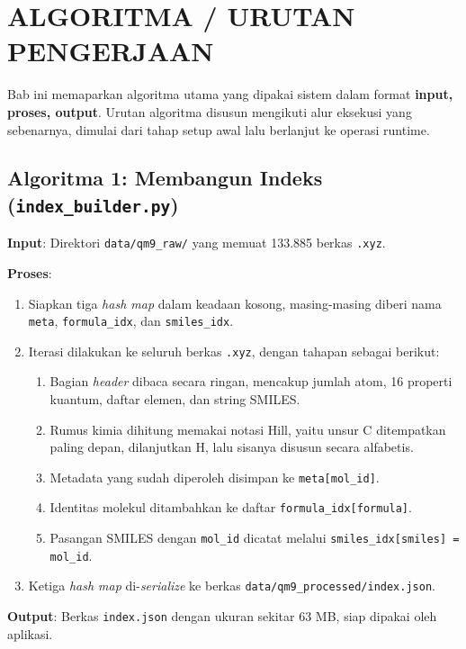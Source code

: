 \documentclass[a4paper,12pt]{report}
\begin{document}
\chapter{ALGORITMA / URUTAN PENGERJAAN}

Bab ini memaparkan algoritma utama yang dipakai sistem dalam format \textbf{input, proses, output}. Urutan algoritma disusun mengikuti alur eksekusi yang sebenarnya, dimulai dari tahap setup awal lalu berlanjut ke operasi runtime.

\section{Algoritma 1: Membangun Indeks (\texttt{index\_builder.py})}

\textbf{Input}: Direktori \texttt{data/qm9\_raw/} yang memuat 133.885 berkas \texttt{.xyz}.

\textbf{Proses}:

\begin{enumerate}
    \item Siapkan tiga \textit{hash map} dalam keadaan kosong, masing-masing diberi nama \texttt{meta}, \texttt{formula\_idx}, dan \texttt{smiles\_idx}.
    \item Iterasi dilakukan ke seluruh berkas \texttt{.xyz}, dengan tahapan sebagai berikut:
    \begin{enumerate}
        \item Bagian \textit{header} dibaca secara ringan, mencakup jumlah atom, 16 properti kuantum, daftar elemen, dan string SMILES.
        \item Rumus kimia dihitung memakai notasi Hill, yaitu unsur C ditempatkan paling depan, dilanjutkan H, lalu sisanya disusun secara alfabetis.
        \item Metadata yang sudah diperoleh disimpan ke \texttt{meta[mol\_id]}.
        \item Identitas molekul ditambahkan ke daftar \texttt{formula\_idx[formula]}.
        \item Pasangan SMILES dengan \texttt{mol\_id} dicatat melalui \texttt{smiles\_idx[smiles] = mol\_id}.
    \end{enumerate}
    \item Ketiga \textit{hash map} di-\textit{serialize} ke berkas \texttt{data/qm9\_processed/index.json}.
\end{enumerate}

\textbf{Output}: Berkas \texttt{index.json} dengan ukuran sekitar 63 MB, siap dipakai oleh aplikasi.
\end{document}
